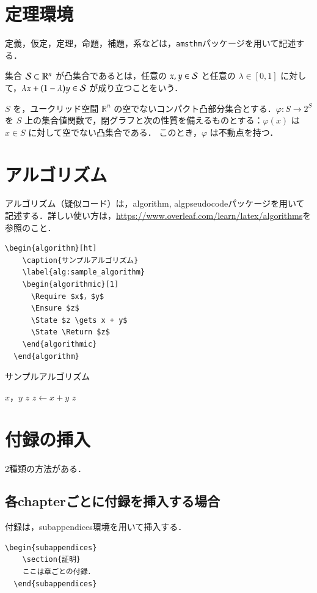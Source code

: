 \documentclass[../main/main]{subfiles}
\begin{document}
\section{定理環境}
定義，仮定，定理，命題，補題，系などは，\verb|amsthm|パッケージを用いて記述する．
\begin{dfn}[凸集合]
  集合 $\mathcal{S} \subset \mathbb{R}^n$ が凸集合であるとは，任意の $x, y \in \mathcal{S}$ と任意の $\lambda \in [0, 1]$ に対して，$\lambda x + (1 - \lambda) y \in \mathcal{S}$ が成り立つことをいう．
\end{dfn}
\begin{thm}[角谷の不動点定理]
  \label{thm:Kakutani}
  $S$ を，ユークリッド空間 $\mathbb{R}^n$ の空でないコンパクト凸部分集合とする．$\varphi: S \rightarrow 2^S$ を $S$ 上の集合値関数で，閉グラフと次の性質を備えるものとする：$\varphi(x)$ は $x \in S$ に対して空でない凸集合である．
  このとき，$\varphi$ は不動点を持つ．
\end{thm}



\newpage
\section{アルゴリズム}
アルゴリズム（疑似コード）は，algorithm, algpseudocodeパッケージを用いて記述する．詳しい使い方は，\url{https://www.overleaf.com/learn/latex/algorithms}を参照のこと．
\begin{lstlisting}[language={[latex]TeX}]
  \begin{algorithm}[ht]
    \caption{サンプルアルゴリズム}
    \label{alg:sample_algorithm}
    \begin{algorithmic}[1]
      \Require $x$，$y$
      \Ensure $z$
      \State $z \gets x + y$
      \State \Return $z$
    \end{algorithmic}
  \end{algorithm}
\end{lstlisting}
\begin{algorithm}[!ht]
  \caption{サンプルアルゴリズム}
  \label{alg:sample_algorithm}
  \begin{algorithmic}[1]
    \Require $x$，$y$
    \Ensure $z$
    \State $z \gets x + y$
    \State \Return $z$
  \end{algorithmic}
\end{algorithm}

\section{付録の挿入}
2種類の方法がある．
\subsection{各chapterごとに付録を挿入する場合}
付録は，subappendices環境を用いて挿入する．
\begin{lstlisting}[language={[latex]TeX}]
  \begin{subappendices}
    \section{証明}
    ここは章ごとの付録．
  \end{subappendices}
\end{lstlisting}
\end{document}
